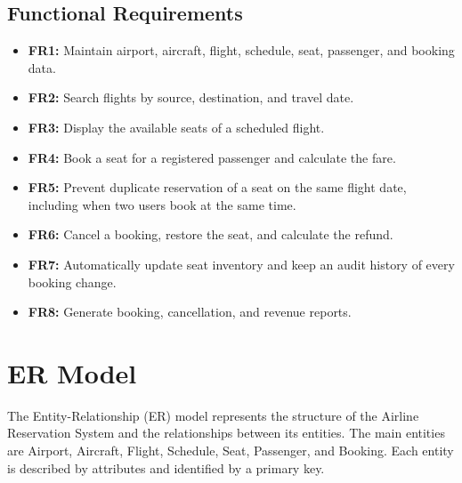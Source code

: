 \documentclass[12pt,a4paper]{article}
\begin{document}
\subsection{Functional Requirements}
\begin{itemize}[nosep]
  \item \textbf{FR1:} Maintain airport, aircraft, flight, schedule, seat, passenger, and booking data.
  \item \textbf{FR2:} Search flights by source, destination, and travel date.
  \item \textbf{FR3:} Display the available seats of a scheduled flight.
  \item \textbf{FR4:} Book a seat for a registered passenger and calculate the fare.
  \item \textbf{FR5:} Prevent duplicate reservation of a seat on the same flight date, including when two
        users book at the same time.
  \item \textbf{FR6:} Cancel a booking, restore the seat, and calculate the refund.
  \item \textbf{FR7:} Automatically update seat inventory and keep an audit history of every booking change.
  \item \textbf{FR8:} Generate booking, cancellation, and revenue reports.
\end{itemize}

\section{ER Model}
The Entity-Relationship (ER) model represents the structure of the Airline Reservation System and the
relationships between its entities. The main entities are Airport, Aircraft, Flight, Schedule, Seat,
Passenger, and Booking. Each entity is described by attributes and identified by a primary key.
\end{document}
